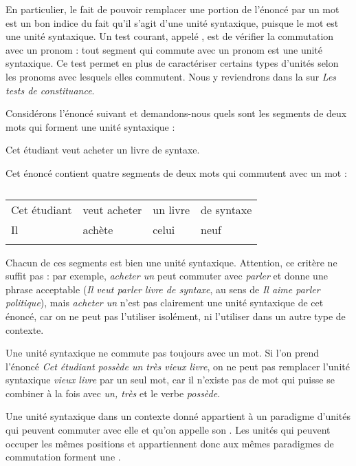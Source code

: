 En particulier, le fait de pouvoir remplacer une portion de l’énoncé par un mot est un bon indice du fait qu’il s’agit d’une unité syntaxique, puisque le mot est une unité syntaxique. Un test courant, appelé , est de vérifier la commutation avec un pronom : tout segment qui commute avec un pronom est une unité syntaxique. Ce test permet en plus de caractériser certains types d’unités selon les pronoms avec lesquels elles commutent. Nous y reviendrons dans la  sur \textit{Les tests de constituance}.

Considérons l’énoncé suivant et demandons-nous quels sont les segments de deux mots qui forment une unité syntaxique :

\ea
    {Cet étudiant veut acheter un livre de syntaxe.}
\z

Cet énoncé contient quatre segments de deux mots qui commutent avec un mot :

\begin{table}
\caption{\label{tab:}}
\begin{tabularx}{\textwidth}{XXXX}
\lsptoprule
{ Cet étudiant} & { veut acheter} & { un livre} & { de syntaxe}\\
{ Il} & { achète} & { celui} & { neuf}\\
\lspbottomrule
\end{tabularx}
\end{table}

Chacun de ces segments est bien une unité syntaxique. Attention, ce critère ne suffit pas : par exemple, \textit{acheter un} peut commuter avec \textit{parler} et donne une phrase acceptable (\textit{Il veut parler livre de syntaxe}, au sens de \textit{Il aime parler politique}), mais \textit{acheter un} n’est pas clairement une unité syntaxique de cet énoncé, car on ne peut pas l’utiliser isolément, ni l’utiliser dans un autre type de contexte.

Une unité syntaxique ne commute pas toujours avec un mot. Si l’on prend l’énoncé \textit{Cet étudiant possède un très vieux livre}, on ne peut pas remplacer l’unité syntaxique \textit{vieux livre} par un seul mot, car il n’existe pas de mot qui puisse se combiner à la fois avec \textit{un, très} et le verbe \textit{possède}.

\begin{styleLivreImportant}
Une unité syntaxique dans un contexte donné appartient à un paradigme d’unités qui peuvent commuter avec elle et qu’on appelle son . Les unités qui peuvent occuper les mêmes positions et appartiennent donc aux mêmes paradigmes de commutation forment une .
\end{styleLivreImportant}

